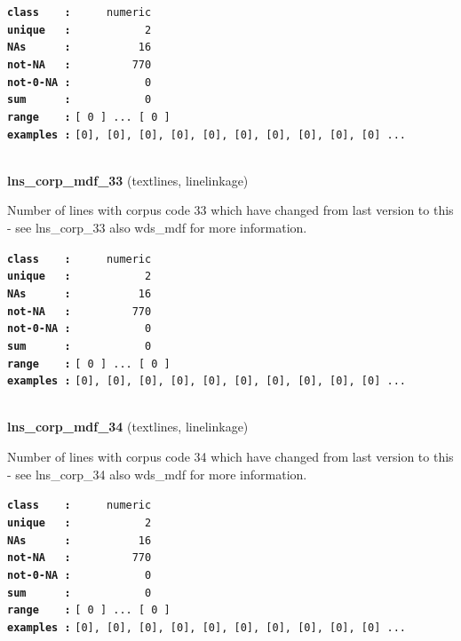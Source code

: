 \documentclass[]{article}
\begin{document}
\textbf{\texttt{class\ \ \ \ :}} \texttt{~~~~~numeric}\\
\textbf{\texttt{unique\ \ \ :}} \texttt{~~~~~~~~~~~2}\\
\textbf{\texttt{NAs\ \ \ \ \ \ :}} \texttt{~~~~~~~~~~16}\\
\textbf{\texttt{not-NA\ \ \ :}} \texttt{~~~~~~~~~770}\\
\textbf{\texttt{not-0-NA\ :}} \texttt{~~~~~~~~~~~0}\\
\textbf{\texttt{sum\ \ \ \ \ \ :}} \texttt{~~~~~~~~~~~0}\\
\textbf{\texttt{range\ \ \ \ :}}
\texttt{{[}\ 0\ {]}\ ...\ {[}\ 0\ {]}}\\
\textbf{\texttt{examples\ :}}
\texttt{{[}0{]},\ {[}0{]},\ {[}0{]},\ {[}0{]},\ {[}0{]},\ {[}0{]},\ {[}0{]},\ {[}0{]},\ {[}0{]},\ {[}0{]}\ ...}\\

~

\textbf{lns\_corp\_mdf\_33} (textlines, linelinkage)

Number of lines with corpus code 33 which have changed from last version
to this - see lns\_corp\_33 also wds\_mdf for more information.

\textbf{\texttt{class\ \ \ \ :}} \texttt{~~~~~numeric}\\
\textbf{\texttt{unique\ \ \ :}} \texttt{~~~~~~~~~~~2}\\
\textbf{\texttt{NAs\ \ \ \ \ \ :}} \texttt{~~~~~~~~~~16}\\
\textbf{\texttt{not-NA\ \ \ :}} \texttt{~~~~~~~~~770}\\
\textbf{\texttt{not-0-NA\ :}} \texttt{~~~~~~~~~~~0}\\
\textbf{\texttt{sum\ \ \ \ \ \ :}} \texttt{~~~~~~~~~~~0}\\
\textbf{\texttt{range\ \ \ \ :}}
\texttt{{[}\ 0\ {]}\ ...\ {[}\ 0\ {]}}\\
\textbf{\texttt{examples\ :}}
\texttt{{[}0{]},\ {[}0{]},\ {[}0{]},\ {[}0{]},\ {[}0{]},\ {[}0{]},\ {[}0{]},\ {[}0{]},\ {[}0{]},\ {[}0{]}\ ...}\\

~

\textbf{lns\_corp\_mdf\_34} (textlines, linelinkage)

Number of lines with corpus code 34 which have changed from last version
to this - see lns\_corp\_34 also wds\_mdf for more information.

\textbf{\texttt{class\ \ \ \ :}} \texttt{~~~~~numeric}\\
\textbf{\texttt{unique\ \ \ :}} \texttt{~~~~~~~~~~~2}\\
\textbf{\texttt{NAs\ \ \ \ \ \ :}} \texttt{~~~~~~~~~~16}\\
\textbf{\texttt{not-NA\ \ \ :}} \texttt{~~~~~~~~~770}\\
\textbf{\texttt{not-0-NA\ :}} \texttt{~~~~~~~~~~~0}\\
\textbf{\texttt{sum\ \ \ \ \ \ :}} \texttt{~~~~~~~~~~~0}\\
\textbf{\texttt{range\ \ \ \ :}}
\texttt{{[}\ 0\ {]}\ ...\ {[}\ 0\ {]}}\\
\textbf{\texttt{examples\ :}}
\texttt{{[}0{]},\ {[}0{]},\ {[}0{]},\ {[}0{]},\ {[}0{]},\ {[}0{]},\ {[}0{]},\ {[}0{]},\ {[}0{]},\ {[}0{]}\ ...}\\
\end{document}
